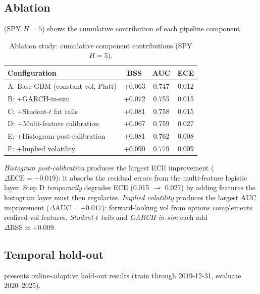 \documentclass[11pt,a4paper]{article}
\begin{document}
\subsection{Ablation}

 (SPY $H\!=\!5$) shows the cumulative contribution of each pipeline component.

\begin{table}[htbp]
\centering
\small
\caption{Ablation study: cumulative component contributions (SPY $H\!=\!5$).}
\label{tab:ablation}
\begin{tabular}{lccc}
\toprule
Configuration & BSS & AUC & ECE \\
\midrule
A: Base GBM (constant vol, Platt)     & +0.063 & 0.747 & 0.012 \\
B: +GARCH-in-sim                      & +0.072 & 0.755 & 0.015 \\
C: +Student-$t$ fat tails             & +0.081 & 0.758 & 0.015 \\
D: +Multi-feature calibration         & +0.067 & 0.759 & 0.027 \\
E: +Histogram post-calibration        & +0.081 & 0.762 & 0.008 \\
F: +Implied volatility                & +0.090 & 0.779 & 0.009 \\
\bottomrule
\end{tabular}
\end{table}

\emph{Histogram post-calibration} produces the largest ECE improvement ($\Delta\text{ECE} = -0.019$): it absorbs the residual errors from the multi-feature logistic layer. Step D \emph{temporarily} degrades ECE (0.015 $\to$ 0.027) by adding features the histogram layer must then regularize. \emph{Implied volatility} produces the largest AUC improvement ($\Delta\text{AUC} = +0.017$): forward-looking vol from options complements realized-vol features. \emph{Student-$t$ tails} and \emph{GARCH-in-sim} each add $\Delta\text{BSS} \approx +0.009$.

\subsection{Temporal hold-out}

 presents online-adaptive hold-out results (train through 2019-12-31, evaluate 2020--2025).
\end{document}
